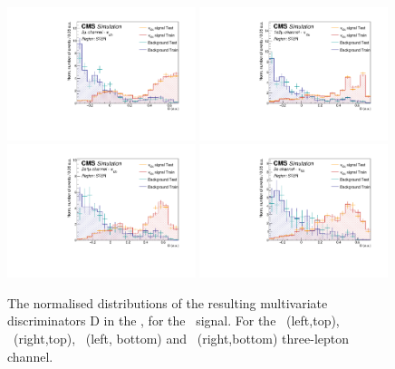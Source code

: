 \begin{figure}[htbp]
	\centering
	\includegraphics[width=0.49\textwidth]{6_Search/Figures/PlotsTechnics/SigVsBkgTestZctsingletopuuu}
	\includegraphics[width=0.49\textwidth]{6_Search/Figures/PlotsTechnics/SigVsBkgTestZctsingletopuue}
	\includegraphics[width=0.49\textwidth]{6_Search/Figures/PlotsTechnics/SigVsBkgTestZctsingletopeeu}
	\includegraphics[width=0.49\textwidth]{6_Search/Figures/PlotsTechnics/SigVsBkgTestZctsingletopeee}
	\caption{The normalised distributions of the resulting  multivariate discriminators D in the \STSR, for the \Zct\ signal. For the \mumumu\ (left,top), \emumu\ (right,top), \eemu\ (left, bottom) and \eee\ (right,bottom) three-lepton channel.}
	\label{fig:sigvsbkgtestzctsingletop}
\end{figure}




